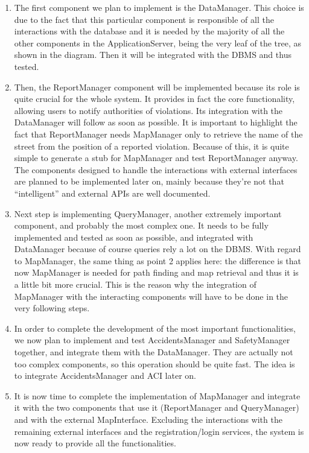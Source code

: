 		\begin{enumerate}
			\item The first component we plan to implement is the DataManager. This choice is due to the fact that this particular component is responsible of all the interactions with the database and it is needed by the majority of all the other components in the ApplicationServer, being the very leaf of the tree, as shown in the diagram. Then it will be integrated with the DBMS and thus tested.
			
			\item Then, the ReportManager component will be implemented because its role is quite crucial for the whole system. It provides in fact the core functionality, allowing users to notify authorities of violations. Its integration with the DataManager will follow as soon as possible. It is important to highlight the fact that ReportManager needs MapManager only to retrieve the name of the street from the position of a reported violation. Because of this, it is quite simple to generate a stub for MapManager and test ReportManager anyway. The components designed to handle the interactions with external interfaces are planned to be implemented later on, mainly because they’re not that “intelligent” and external APIs are well documented. 
			
			\item Next step is implementing QueryManager, another extremely important component, and probably the most complex one. It needs to be fully implemented and tested as soon as possible, and integrated with DataManager because of course queries rely a lot on the DBMS. With regard to MapManager, the same thing as point 2 applies here: the difference is that now MapManager is needed for path finding and map retrieval and thus it is a little bit more crucial. This is the reason why the integration of MapManager with the interacting components will have to be done in the very following steps.
			
			\item In order to complete the development of the most important functionalities, we now plan to implement and test AccidentsManager and SafetyManager together, and integrate them with the DataManager. They are actually not too complex components, so this operation should be quite fast. The idea is to integrate AccidentsManager and ACI later on.
			
			\item It is now time to complete the implementation of MapManager and integrate it with the two components that use it (ReportManager and QueryManager) and with the external MapInterface. Excluding the interactions with the remaining external interfaces and the registration/login services, the system is now ready to provide all the functionalities.
			

\end{enumerate}
